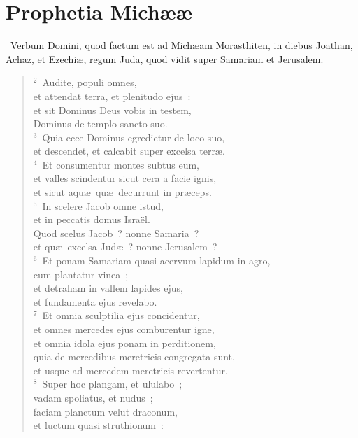 {\centering \section*{Prophetia Michææ}}\thispagestyle{empty}

~Verbum Domini, quod factum est ad Mich\ae am Morasthiten, in diebus Joathan, Achaz, et Ezechi\ae , regum Juda, quod vidit super Samariam et Jerusalem.


\begin{flushleft}\begin{verse}\vspace{6pt}${}^{2}$~Audite, populi omnes,\\ et attendat terra, et plenitudo ejus~:\\ et sit Dominus Deus vobis in testem,\\ Dominus de templo sancto suo.\\
${}^{3}$~Quia ecce Dominus egredietur de loco suo,\\ et descendet, et calcabit super excelsa terr\ae .\\
${}^{4}$~Et consumentur montes subtus eum,\\ et valles scindentur sicut cera a facie ignis,\\ et sicut aqu\ae\ qu\ae\ decurrunt in pr\ae ceps.\\
${}^{5}$~In scelere Jacob omne istud,\\ et in peccatis domus Isra\"el.\\ Quod scelus Jacob~? nonne Samaria~?\\ et qu\ae\ excelsa Jud\ae~? nonne Jerusalem~?\\
${}^{6}$~Et ponam Samariam quasi acervum lapidum in agro,\\ cum plantatur vinea~;\\ et detraham in vallem lapides ejus,\\ et fundamenta ejus revelabo.\\
${}^{7}$~Et omnia sculptilia ejus concidentur,\\ et omnes mercedes ejus comburentur igne,\\ et omnia idola ejus ponam in perditionem,\\ quia de mercedibus meretricis congregata sunt,\\ et usque ad mercedem meretricis revertentur.\\
${}^{8}$~Super hoc plangam, et ululabo~;\\ vadam spoliatus, et nudus~;\\ faciam planctum velut draconum,\\ et luctum quasi struthionum~:\\

\end{verse}
\end{flushleft}
